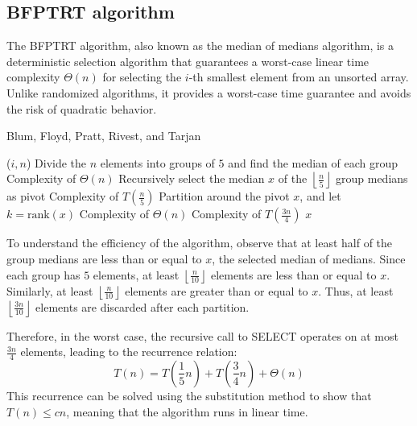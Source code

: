 \subsection{BFPTRT algorithm}
The BFPTRT algorithm, also known as the median of medians algorithm, is a deterministic selection algorithm that guarantees a worst-case linear time complexity $\Theta(n)$ for selecting the $i$-th smallest element from an unsorted array. 
Unlike randomized algorithms, it provides a worst-case time guarantee and avoids the risk of quadratic behavior.
\begin{algorithm}[H]
    \caption{Blum, Floyd, Pratt, Rivest, and Tarjan}
    \begin{algorithmic}[1]
        ($i,n$) 
            \State Divide the $n$ elements into groups of $5$ and find the  median of each group \Comment Complexity of $\Theta(n)$
            \State Recursively select the median $x$ of the $\left\lfloor \frac{n}{5} \right\rfloor$ group medians as pivot \Comment Complexity of $T\left(\frac{n}{5}\right)$
            \State Partition around the pivot $x$, and let $k = \text{rank}(x)$ \Comment Complexity of $\Theta(n)$
             \Comment Complexity of $T\left(\frac{3n}{4}\right)$
                \State \Return $x$ 
                \State {}
            \Else 
                \State {}
            \EndIf
        \EndFunction
    \end{algorithmic}
\end{algorithm}  
To understand the efficiency of the algorithm, observe that at least half of the group medians are less than or equal to $x$, the selected median of medians.
Since each group has $5$ elements, at least $\left\lfloor\frac{n}{10}\right\rfloor$ elements are less than or equal to $x$. 
Similarly, at least $\left\lfloor\frac{n}{10}\right\rfloor$ elements are greater than or equal to $x$. 
Thus, at least $\left\lfloor\frac{3n}{10}\right\rfloor$ elements are discarded after each partition.

Therefore, in the worst case, the recursive call to SELECT operates on at most $\frac{3n}{4}$ elements, leading to the recurrence relation:
\[T(n)=T\left(\dfrac{1}{5}n\right)+T\left(\dfrac{3}{4}n\right)+\Theta(n)\]
This recurrence can be solved using the substitution method to show that $T(n)\leq cn$, meaning that the algorithm runs in linear time.

